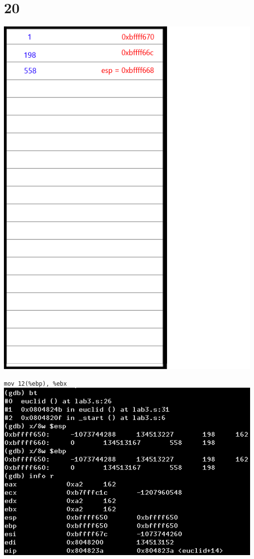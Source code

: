 \documentclass{article}
\begin{document}
\section*{20}
\begin{minipage}{5cm}
\includegraphics[scale=0.3]{s3.png}
\end{minipage}
\begin{minipage}{8cm}
\verb|mov 12(%ebp), %ebx|\\
\includegraphics[scale=0.4]{bxi20.png} \\
\end{minipage}
\clearpage
\end{document}

